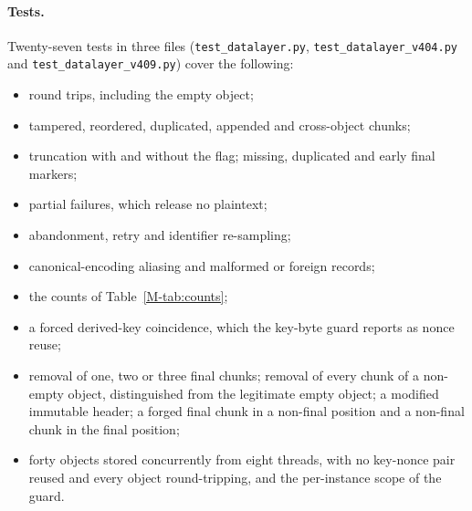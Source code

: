 \documentclass[pdflatex,sn-mathphys-num]{sn-jnl}
\newcommand{\fpath}[1]{\nolinkurl{#1}}%
\begin{document}
\paragraph{Tests.}
Twenty-seven tests in three files (\fpath{test_datalayer.py}, \fpath{test_datalayer_v404.py} and \fpath{test_datalayer_v409.py}) cover the following:
\begin{itemize}
\item round trips, including the empty object;
\item tampered, reordered, duplicated, appended and cross-object chunks;
\item truncation with and without the flag; missing, duplicated and early final markers;
\item partial failures, which release no plaintext;
\item abandonment, retry and identifier re-sampling;
\item canonical-encoding aliasing and malformed or foreign records;
\item the counts of Table~\ref{M-tab:counts};
\item a forced derived-key coincidence, which the key-byte guard reports as nonce reuse;
\item removal of one, two or three final chunks; removal of every chunk of a non-empty object, distinguished from the legitimate empty object; a modified immutable header; a forged final chunk in a non-final position and a non-final chunk in the final position;
\item forty objects stored concurrently from eight threads, with no key-nonce pair reused and every object round-tripping, and the per-instance scope of the guard.
\end{itemize}
\end{document}
